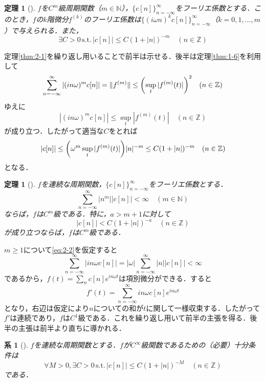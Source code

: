 \documentclass[dvipdfmx,a4j,10pt]{jsarticle}
\makeatletter
\theoremstyle{mystyle1}
\newtheorem{theorem}[definition]{定理}
\newtheorem{corollary}[definition]{系}
\theoremstyle{mystyle3}
\theoremstyle{mystyle4}
\theoremstyle{mystyle2}
\renewenvironment{proof}[1][\proofname]{\par
  \pushQED{\qed}%
  \normalfont
  \topsep6\p@\@plus6\p@ \trivlist
  \item[\hskip\labelsep{\bfseries\sffamily #1}]\ignorespaces
}{%
  \popQED\endtrivlist\@endpefalse
}
\renewcommand\proofname{証明}
\newenvironment{cor}[1][]
{\begin{tcolorbox}[
    enhanced,
    boxrule=0pt,
    arc=0mm,
    frame hidden,
    borderline west={2pt}{-4pt}{blue!50!black},
    breakable = true
    ]
    \begin{corollary}[#1]
}
{\end{corollary}\end{tcolorbox}}
\newenvironment{thm}[1][]
{\begin{tcolorbox}[
    enhanced,
    boxrule=0pt,
    arc=0mm,
    frame hidden,
    borderline west={2pt}{-4pt}{red},
    breakable = true
    ]
    \begin{theorem}[#1]
}
{\end{theorem}\end{tcolorbox}}
\makeatother
\begin{document}
\begin{thm}\label{thm:2-2}
    $f$を$C^m$級周期関数（$m\in\mathbb{N}$），$\{c[n]\}_{n=-\infty}^\infty$をフーリエ係数とする．このとき，$f$の$k$階微分$f^{(k)}$のフーリエ係数は$\{(i\omega n)^k c[n]\}_{n=-\infty}^\infty$（$k=0,1,\ldots,m$）で与えられる．また，
    \begin{equation}\label{eq:2-1}
        \exists C>0\,\textrm{s.t.}\,|c[n]|\leq C(1+|n|)^{-m}\quad (n\in\mathbb{Z})
    \end{equation}
\end{thm}

\begin{proof}
    定理\ref{thm:2-1}を繰り返し用いることで前半は示せる．後半は定理\ref{thm:1-6}を利用して
    \[
        \sum_{n=-\infty}^\infty |(in\omega)^m c[n]|=\|f^{(m)}\|\leq\mleft(\sup_t|f^{(m)}(t)|\mright)^2\quad(n\in\mathbb{Z})
    \]
    ゆえに
    \[
        |(in\omega)^m c[n]|\leq\sup_t|f^{(m)}(t)|\quad(n\in\mathbb{Z})
    \]
    が成り立つ．したがって適当な$C$をとれば
    \[
        |c[n]|\leq\mleft(\omega^m\sup_t|f^{(m)}(t)|\mright)|n|^{-m}\leq C(1+|n|)^{-m}\quad(n\in\mathbb{Z})
    \]
    となる．
\end{proof}

\begin{thm}\label{thm:2-3}
    $f$を連続な周期関数，$\{c[n]\}_{n=-\infty}^\infty$をフーリエ係数とする．
    \begin{equation}\label{eq:2-2}
        \sum_{n=-\infty}^\infty |n^m||c[n]|<\infty\quad(m\in\mathbb{N})
    \end{equation}
    ならば，$f$は$C^m$級である．特に，$a>m+1$に対して
    \[
        |c[n]|<C(1+|n|)^{-a}\quad (n\in\mathbb{Z})
    \]
    が成り立つならば，$f$は$C^m$級である．
\end{thm}

\begin{proof}
    $m\geq 1$について\eqref{eq:2-2}を仮定すると
    \[
        \sum_{n=-\infty}^\infty |in\omega c[n]|=|\omega|\sum_{n=-\infty}^\infty |n||c[n]|<\infty
    \]
    であるから，$f(t)=\sum_n c[n]e^{in\omega t}$は項別微分ができる．すると
    \[
        f'(t)=\sum_{n=-\infty}^\infty in\omega c[n]e^{in\omega t}
    \]
    となり，右辺は仮定により$n$についての和が$t$に関して一様収束する．したがって$f'$は連続であり，$f$は$C^1$級である．これを繰り返し用いて前半の主張を得る．後半の主張は前半より直ちに導かれる．
\end{proof}

\begin{cor}\label{cor:2-4}
    $f$を連続な周期関数とする．$f$が$C^\infty$級関数であるための（必要）十分条件は
    \[
        \forall M>0,\exists C>0\,\textrm{s.t.}\,|c[n]|\leq C(1+|n|)^{-M}\quad(n\in\mathbb{Z})
    \]
    である．
\end{cor}
\end{document}
